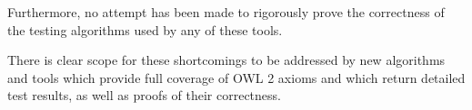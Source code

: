 \documentclass[paper.tex]{subfiles}
\begin{document}
Furthermore, no attempt has been made to rigorously prove the correctness of the testing algorithms used by any of these tools.

There is clear scope for these shortcomings to be addressed by new algorithms and tools which provide full coverage of OWL 2 axioms and which return detailed test results, as well as proofs of their correctness.
\end{document}
